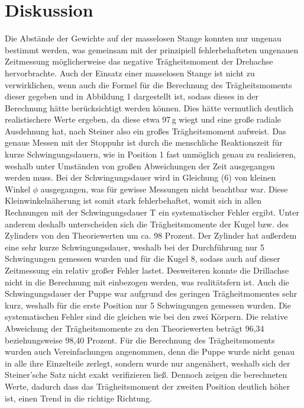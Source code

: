 \section{Diskussion}
\label{sec:Diskussion}

Die Abstände der Gewichte auf der masselosen Stange konnten nur
ungenau bestimmt werden, was gemeinsam mit der prinzipiell fehlerbehafteten ungenauen Zeitmessung möglicherweise das negative Trägheitsmoment
der Drehachse hervorbrachte. Auch der Einsatz einer masselosen Stange ist nicht
zu verwirklichen, wenn auch die Formel für die Berechnung des Trägheitsmoments dieser gegeben und
in Abbildung 1 dargestellt ist, sodass dieses in der Berechnung hätte berücksichtigt werden können.
Dies hätte vermutlich deutlich realistischere Werte ergeben, da diese etwa 97\,\si{\gram} wiegt und eine große radiale Ausdehnung hat, nach Steiner
also ein großes Trägheitsmoment aufweist.
Das genaue Messen mit der Stoppuhr ist durch die menschliche Reaktionszeit für
kurze Schwingungsdauern, wie in Position 1 fast unmöglich genau zu realisieren, weshalb
unter Umständen von großen Abweichungen der Zeit ausgegangen werden muss.
Bei der Schwingungsdauer wird in Gleichung (6) von kleinen Winkel $\phi$ ausgegangen, was für gewisse Messungen
nicht beachtbar war. Diese Kleinwinkelnäherung ist somit stark fehlerbehaftet, womit sich in allen Rechnungen mit der Schwingungsdauer
T ein systematischer Fehler ergibt. Unter anderem deshalb unterscheiden sich
die Trägheitsmomente der Kugel bzw. des Zylinders von den Theoriewerten um
ca. 98 Prozent. Der Zylinder hat außerdem eine sehr kurze Schwingungsdauer,
weshalb bei der Durchführung nur 5 Schwingungen gemessen wurden und für die Kugel 8, sodass auch auf dieser Zeitmessung ein relativ großer Fehler lastet.
Desweiteren konnte die Drillachse nicht in die Berechnung mit einbezogen werden, was realitätsfern ist.
Auch die Schwingungsdauer der Puppe war aufgrund des geringen Trägheitmomentes sehr kurz, weshalb 
für die erste Position nur 5 Schwingungen gemessen wurden.
Die systematischen Fehler sind die gleichen wie bei den zwei Körpern.
Die relative Abweichung der Trägheitsmomente zu den Theoriewerten beträgt 96,34 beziehungsweise 98,40 Prozent. 
Für die Berechnung des Trägheitsmoments wurden auch Vereinfachungen angenommen,
denn die Puppe wurde nicht genau in alle ihre Einzelteile zerlegt, sondern wurde nur angenähert,
weshalb sich der Steiner'sche Satz nicht exakt verifizieren ließ. Dennoch zeigen die berechneten Werte, dadurch
dass das Trägheitsmoment der zweiten Position deutlich höher ist, einen Trend in die richtige Richtung.